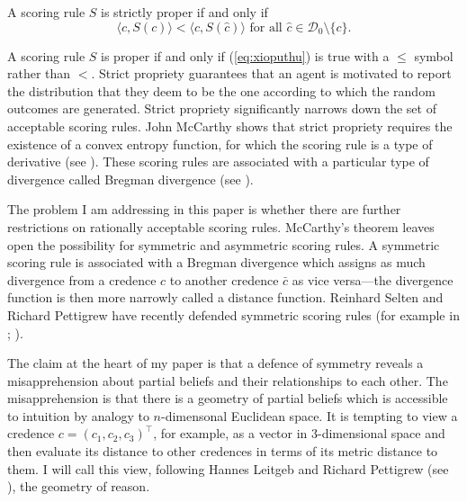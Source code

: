 \documentclass[12pt]{article}
\begin{document}
\begin{definition}
  \label{def:mohmaexi}
A scoring rule $S$ is strictly proper if and only if
\begin{equation}
  \label{eq:xioputhu}
  \langle{}c,S(c)\rangle<\langle{}c,S(\hat{c})\rangle\mbox{ for all }\hat{c}\in\mathcal{D}_{0}\setminus\{c\}.
\end{equation}
\end{definition}

A scoring rule $S$ is proper if and only if (\ref{eq:xioputhu}) is
true with a $\leq$ symbol rather than $<$.
Strict propriety guarantees that an agent is motivated to report the
distribution that they deem to be the one according to which the
random outcomes are generated. Strict propriety significantly narrows
down the set of acceptable scoring rules. John McCarthy shows that
strict propriety requires the existence of a convex entropy function,
for which the scoring rule is a type of derivative (see
). These scoring rules are associated with a
particular type of divergence called Bregman divergence (see
).

The problem I am addressing in this paper is whether there are further
restrictions on rationally acceptable scoring rules. McCarthy's
theorem leaves open the possibility for symmetric and asymmetric
scoring rules. A symmetric scoring rule is associated with a Bregman
divergence which assigns as much divergence from a credence $c$ to
another credence $\bar{c}$ as vice versa---the divergence function is
then more narrowly called a distance function. Reinhard Selten and
Richard Pettigrew have recently defended symmetric scoring rules (for
example in ; ).

The claim at the heart of my paper is that a defence of symmetry
reveals a misapprehension about partial beliefs and their
relationships to each other. The misapprehension is that there is a
geometry of partial beliefs which is accessible to intuition by
analogy to $n$-dimensonal Euclidean space. It is tempting to view a
credence $c=(c_{1},c_{2},c_{3})^{\intercal}$, for example, as a vector
in 3-dimensional space and then evaluate its distance to other
credences in terms of its metric distance to them. I will call this
view, following Hannes Leitgeb and Richard Pettigrew (see
), the geometry of reason.
\end{document}
